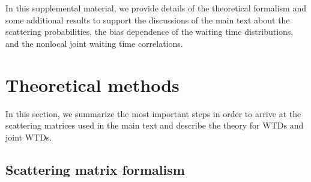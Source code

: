 \documentclass[aps,prl,amsmath,twocolumn,floatfix,superscriptaddress,longbibliography,footinbib]{revtex4-1}
\begin{document}
In this supplemental material, we provide details of the theoretical formalism and some additional results to support the discussions of the main text about the scattering probabilities, the bias dependence of the waiting time distributions, and the nonlocal joint waiting time correlations. 

\section{Theoretical methods} \label{sec:App-method}

In this section, we summarize the most important steps in order to arrive at the scattering matrices used in the main text and describe the theory for WTDs and joint WTDs.

\subsection{Scattering matrix formalism\label{apnd1}}
\end{document}
